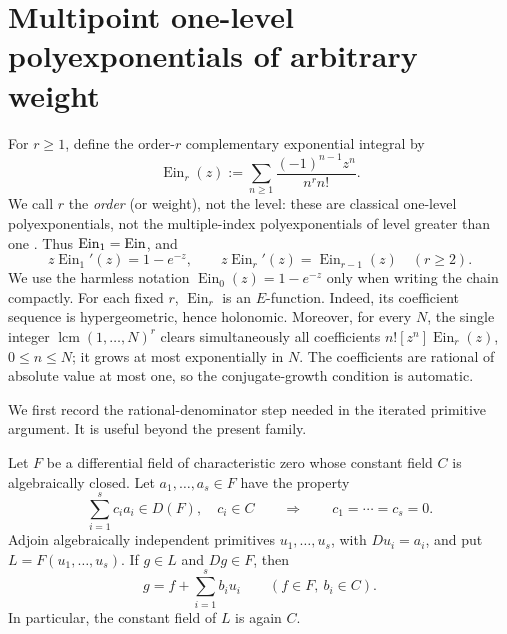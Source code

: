 \providecommand{\EinDepth}[1]{\operatorname{Ein}_{#1}}
\providecommand{\Eexp}{\mathcal E_{\mathrm{exp}}}

\section{Multipoint one-level polyexponentials of arbitrary weight}
\label{sec:ein-depth-tower}

For \(r\geq1\), define the order-\(r\) complementary exponential
integral by
\begin{equation}\label{eq:ein-depth-definition}
 \EinDepth{r}(z)
 :=\sum_{n\geq1}\frac{(-1)^{n-1}z^n}{n^r n!}.
\end{equation}
We call \(r\) the \emph{order} (or weight), not the level: these are
classical one-level polyexponentials, not the multiple-index
polyexponentials of level greater than one
\cite{Hardy1905PartII,Boyadzhiev2007,AminovArnaudo2026}.
Thus \(\EinDepth{1}=\Ein\), and
\begin{equation}\label{eq:ein-depth-chain}
 z\EinDepth{1}'(z)=1-e^{-z},\qquad
 z\EinDepth{r}'(z)=\EinDepth{r-1}(z)\quad(r\geq2).
\end{equation}
We use the harmless notation
\(\EinDepth{0}(z)=1-e^{-z}\)
only when writing the chain compactly.  For each fixed \(r\),
\(\EinDepth{r}\) is an \(E\)-function.  Indeed, its coefficient sequence
is hypergeometric, hence holonomic.  Moreover, for every \(N\), the single
integer \(\operatorname{lcm}(1,\ldots,N)^r\) clears simultaneously all
coefficients \(n![z^n]\EinDepth{r}(z)\), \(0\leq n\leq N\); it grows at
most exponentially in \(N\).  The coefficients are rational of absolute
value at most one, so the conjugate-growth condition is automatic.

We first record the rational-denominator step needed in the iterated
primitive argument.  It is useful beyond the present family.

\begin{lemma}
\label{lem:depth-affine-primitive}
Let \(F\) be a differential field of characteristic zero whose constant
field \(C\) is algebraically closed.  Let
\(a_1,\ldots,a_s\in F\) have the property
\begin{equation}\label{eq:depth-no-base-exact-combination}
 \sum_{i=1}^s c_i a_i\in D(F),\quad c_i\in C
 \qquad\Longrightarrow\qquad c_1=\cdots=c_s=0.
\end{equation}
Adjoin algebraically independent primitives
\(u_1,\ldots,u_s\), with \(Du_i=a_i\), and put
\(L=F(u_1,\ldots,u_s)\).  If \(g\in L\) and \(Dg\in F\), then
\begin{equation}\label{eq:depth-affine-conclusion}
 g=f+\sum_{i=1}^s b_i u_i
 \qquad(f\in F,\ b_i\in C).
\end{equation}
In particular, the constant field of \(L\) is again \(C\).
\end{lemma}


